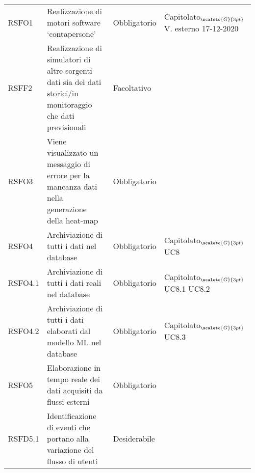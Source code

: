 \def\tabularxcolumn#1{m{#1}}
{

	\begin{center}
		\renewcommand{\arraystretch}{1.4}
		\begin{longtable}{|p{2.5cm}|p{4.5cm}|p{3.5cm}|p{4cm}|}
			\hline
			\rowcolor{airforceblue}
			\makecell[c]{\textbf{Codice RS}} & \makecell[c]{\textbf{Descrizione}} & \makecell[c]{\textbf{Tipo di requisito}} & \makecell[c]{\textbf{Fonte}} \\
			\hline
			\centering RSFO1 & Realizzazione di motori software ‘contapersone’  &\centering  Obbligatorio & \makecell[tc]{Capitolato$_{\scaleto{G}{3pt}}$ \\ V. esterno 17-12-2020 } \\
			\hline
			\centering RSFF2 & Realizzazione di simulatori di altre sorgenti dati sia dei dati storici/in monitoraggio che dati previsionali & \centering Facoltativo & \makecell[tc]{Capitolato$_{\scaleto{G}{3pt}}$ } \\
			\hline
			\centering RSFO3  & Viene visualizzato un messaggio di errore per la mancanza dati nella generazione della heat-map  &\centering  Obbligatorio & \makecell[tc]{UC2}  \\
			\hline
			\centering RSFO4 & Archiviazione di tutti i dati nel database & \centering Obbligatorio & \makecell[tc]{Capitolato$_{\scaleto{G}{3pt}}$ \\ UC8}  \\
			\hline
			\centering RSFO4.1 & Archiviazione di tutti i dati reali nel database & \centering Obbligatorio & \makecell[tc]{Capitolato$_{\scaleto{G}{3pt}}$ \\ UC8.1 \\ UC8.2}  \\
			\hline
			\centering RSFO4.2 & Archiviazione di tutti i dati elaborati dal modello ML nel database & \centering Obbligatorio & \makecell[tc]{Capitolato$_{\scaleto{G}{3pt}}$ \\ UC8.3}  \\
			\hline
			\centering RSFO5 & Elaborazione in tempo reale dei dati acquisiti da flussi esterni &\centering  Obbligatorio & \makecell[tc]{Capitolato$_{\scaleto{G}{3pt}}$}  \\
			\hline
			\centering RSFD5.1 & Identificazione di eventi che portano alla variazione del flusso di utenti &\centering  Desiderabile & \makecell[tc]{Capitolato$_{\scaleto{G}{3pt}}$}  \\

\end{longtable}
\end{center}}
